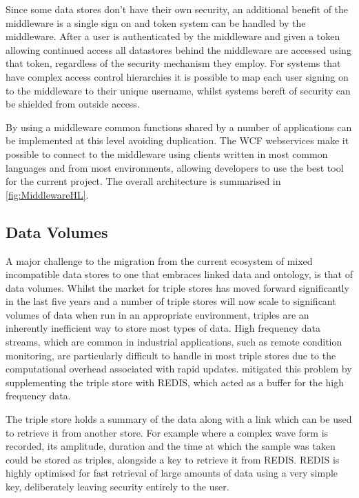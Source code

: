 Since some data stores don't have their own security, an additional benefit of the middleware is a single sign on and token system can be handled by the middleware. After a user is authenticated by the middleware and given a token allowing continued access all datastores behind the middleware are accessed using that token, regardless of the security mechanism they employ. For systems that have complex access control hierarchies it is possible to map each user signing on to the middleware to their unique username, whilst systems bereft of security can be shielded from outside access. 

By using a middleware common functions shared by a number of applications can be implemented at this level avoiding duplication. The WCF webservices make it possible to connect to the middleware using clients written in most common languages and from most environments, allowing developers to use the best tool for the current project. The overall architecture is summarised in \autoref{fig:MiddlewareHL}.

\subsection{Data Volumes}

A major challenge to the migration from the current ecosystem of mixed incompatible data stores to one that embraces linked data and ontology, is that of data volumes. Whilst the market for triple stores has moved forward significantly in the last five years and a number of triple stores will now scale to significant volumes of data when run in an appropriate environment, triples are an inherently inefficient way to store most types of data. High frequency data streams, which are common in industrial applications, such as remote condition monitoring, are particularly difficult to handle in most triple stores due to the computational overhead associated with rapid updates. \citet{Tutcher2015} mitigated this problem by supplementing the triple store with REDIS, which acted as a buffer for the high frequency data.

The triple store holds a summary of the data along with a link which can be used to retrieve it from another store. For example where a complex wave form is recorded, its amplitude, duration and the time at which the sample was taken could be stored as triples, alongside a key to retrieve it from REDIS. REDIS is highly optimised for fast retrieval of large amounts of data using a very simple key, deliberately leaving security entirely to the user.

